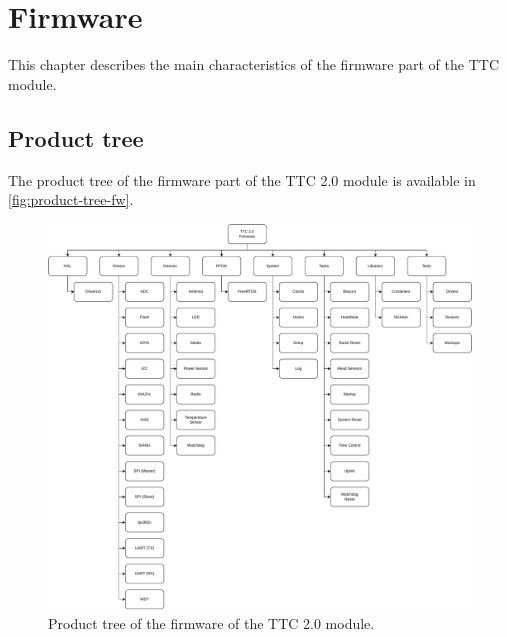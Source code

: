 %
%
%
%
%

%
%
%
%
%


\chapter{Firmware} \label{ch:firmware}

This chapter describes the main characteristics of the firmware part of the TTC module.

\section{Product tree}

The product tree of the firmware part of the TTC 2.0 module is available in \autoref{fig:product-tree-fw}.

\begin{figure}[!ht]
    \begin{center}
        \includegraphics[width=\textwidth]{figures/product-tree-fw.pdf}
        \caption{Product tree of the firmware of the TTC 2.0 module.}
        \label{fig:product-tree-fw}
    \end{center}
\end{figure}

